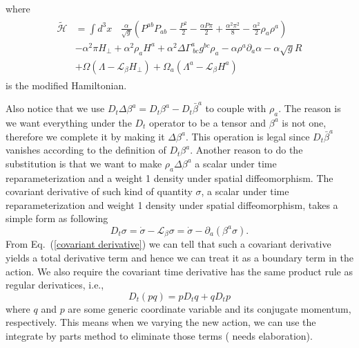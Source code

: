 \documentclass[letterpaper,nofootinbib,prd,amsmath,onecolumn]{revtex4-1}
\begin{document}
where
\begin{align}
\begin{split}
\tilde{\mathscr{H}} & = \int d^{3}x~~~~\frac{\alpha}{\sqrt{g}}\left(P^{ab}P_{ab} - \frac{P^{2}}{2} - \frac{\alpha P \pi}{2} + \frac{\alpha^{2}\pi^{2}}{8} - \frac{\alpha^{2}}{2}\rho_{a}\rho^{a}\right)\\
& -\alpha^{2}\pi H_{\perp} + \alpha^{2}\rho_{a}H^{a} + \alpha^{2}\Delta\Gamma^{a}_{~bc}g^{bc}\rho_{a} - \alpha \rho^{a}\partial_{a}\alpha - \alpha\sqrt{g}R\\
& + \Omega \left(\Lambda - \mathcal{L}_{\beta}H_{\perp}\right) + \Omega_{a} \left( \Lambda^{a} - \mathcal{L}_{\beta}H^{a}\right)
\end{split}
\end{align}
is the modified Hamiltonian. 

Also notice that we use $D_{t}\Delta \beta^{a} = D_{t}\beta^{a} - D_{t}{\bar \beta}^{a}$ to couple with $\rho_{a}$. The reason is we want everything under the $D_{t}$ operator to be a tensor and $\beta^{a}$ is not one, therefore we complete it by making it $\Delta \beta^{a}$. This operation is legal since $D_{t}{\bar \beta}^{a}$ vanishes according to the definition of $D_{t}\beta^{a}$. Another reason to do the substitution is that we want to make $\rho_{a}\Delta \beta^{a}$ a scalar under time reparameterization and a weight 1 density under spatial diffeomorphism. The covariant derivative of such kind of quantity $\sigma$, a scalar under time reparameterization and weight 1 density under spatial diffeomorphism, takes a simple form as following
\begin{equation}\label{covariant derivative}
D_{t}\sigma = \dot{\sigma} - \mathcal{L}_{\beta}\sigma = \dot{\sigma} - \partial_{a}\left( \beta^{a}\sigma \right).
\end{equation}
From Eq.~(\ref{covariant derivative}) we can tell that such a covariant derivative yields a total derivative term and hence we can treat it as a boundary term in the action. We also require the covariant time derivative has the same product rule as regular derivatices, i.e., 
\begin{equation}
D_{t}\left(p q\right) = p D_{t}q + q D_{t}p
\end{equation}
where $q$ and $p$ are some generic coordinate variable and its conjugate momentum, respectively. This means when we varying the new action, we can use the integrate by parts method to eliminate those terms ({\color{red} needs elaboration}). 
\end{document}

